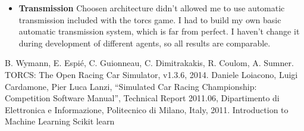 \documentclass[declaration,shortabstract,english,inz]{iithesis}
\begin{document}
\begin{itemize}
    \item \textbf{Transmission} Choosen architecture didn't allowed me to use automatic transmission included with the torcs game. I had to build my own basic automatic transmission system, which is far from perfect. I haven't change it during development of different agents, so all results are comparable. 
\end{itemize}



\begin{thebibliography}{1}
 B. Wymann, E. Espié, C. Guionneau, C. Dimitrakakis, R. Coulom, A. Sumner. TORCS: The Open Racing Car Simulator, v1.3.6, 2014.
 Daniele Loiacono, Luigi Cardamone, Pier Luca Lanzi, “Simulated Car
Racing Championship: Competition Software Manual”, Technical Report 2011.06, Dipartimento
di Elettronica e Informazione, Politecnico di Milano, Italy, 2011.
 Introduction to Machine Learning
 Scikit learn

\end{thebibliography}
\end{document}
